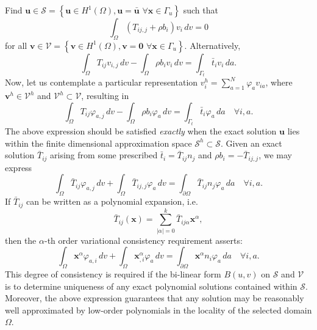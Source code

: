Find $\mathbf{u} \in \mathcal{S} = \left\{ \mathbf{u} \in H^1(\Omega), \mathbf{u} = \bar{\mathbf{u}} \, \, \forall \mathbf{x} \in \Gamma_u \right\}$ such that
\begin{equation}
  \int_\Omega (T_{ij,j} + \rho b_i) v_i \, dv = 0
\end{equation}
for all $\mathbf{v} \in \mathcal{V} = \left\{ \mathbf{v} \in H^1(\Omega), \mathbf{v} = \mathbf{0} \, \, \forall \mathbf{x} \in \Gamma_u \right\}$. Alternatively,
\begin{equation}
  \int_\Omega T_{ij} v_{i,j} \, dv - \int_\Omega \rho b_i v_i \, dv = \int_{\Gamma_t} \bar{t}_i v_i \, da.
\end{equation}
Now, let us contemplate a particular representation $v^h_i = \sum_{a=1}^N \varphi_a v_{ia}$, where $\mathbf{v}^h \in \mathcal{V}^h$ and $\mathcal{V}^h \subset \mathcal{V}$, resulting in
\begin{equation}
  \int_\Omega T_{ij} \varphi_{a,j} \, dv - \int_\Omega \rho b_i \varphi_a \, dv = \int_{\Gamma_t} \bar{t}_i \varphi_a \, da \quad \forall i, a.
\end{equation}
The above expression should be satisfied \textit{exactly} when the exact solution $\mathbf{u}$ lies within the finite dimensional approximation space $\mathcal{S}^h \subset \mathcal{S}$. Given an exact solution $\bar{T}_{ij}$ arising from some prescribed $\bar{t}_i = \bar{T}_{ij} n_j$ and $\rho b_i = - \bar{T}_{ij,j}$, we may express
\begin{equation}
  \int_\Omega \bar{T}_{ij} \varphi_{a,j} \, dv + \int_\Omega \bar{T}_{ij,j} \varphi_a \, dv = \int_{\partial \Omega} \bar{T}_{ij} n_j \varphi_a \, da \quad \forall i, a.
\end{equation}
If $\bar{T}_{ij}$ can be written as a polynomial expansion, i.e.
\begin{equation}
  \bar{T}_{ij} (\mathbf{x}) = \sum_{|\alpha| = 0}^k \bar{T}_{ij\alpha} \mathbf{x}^\alpha,
\end{equation}
then the $\alpha$-th order variational consistency requirement asserts:
\begin{equation}
  \int_\Omega \mathbf{x}^{\alpha} \varphi_{a,i} \, dv + \int_\Omega \mathbf{x}^{\alpha}_{,i} \varphi_a \, dv = \int_{\partial \Omega} \mathbf{x}^{\alpha} n_i \varphi_a \, da \quad \forall i, a.
\end{equation}
This degree of consistency is required if the bi-linear form $B(u,v)$ on $\mathcal{S}$ and $\mathcal{V}$ is to determine uniqueness of any exact polynomial solutions contained within $\mathcal{S}$. Moreover, the above expression guarantees that any solution may be reasonably well approximated by low-order polynomials in the locality of the selected domain $\Omega$.

